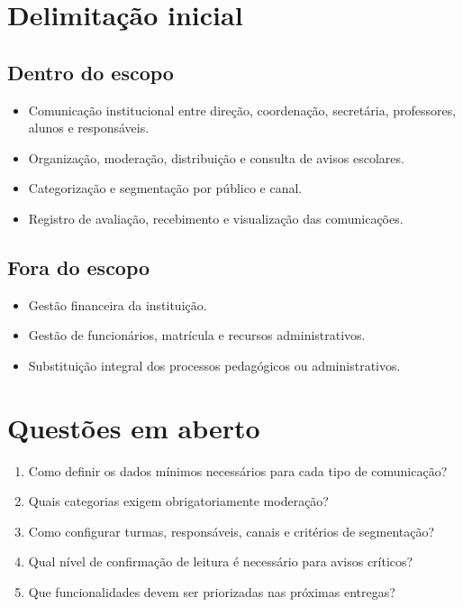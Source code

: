 \section{Delimitação inicial}
\subsection{Dentro do escopo}
\begin{itemize}
\item Comunicação institucional entre direção, coordenação, secretária, professores, alunos e responsáveis.
\item Organização, moderação, distribuição e consulta de avisos escolares.
\item Categorização e segmentação por público e canal.
\item Registro de avaliação, recebimento e visualização das comunicações.
\end{itemize}

\subsection{Fora do escopo}
\begin{itemize}
\item Gestão financeira da instituição.
\item Gestão de funcionários, matrícula e recursos administrativos.
\item Substituição integral dos processos pedagógicos ou administrativos.
\end{itemize}

\section{Questões em aberto}
\begin{enumerate}
\item Como definir os dados mínimos necessários para cada tipo de comunicação?
\item Quais categorias exigem obrigatoriamente moderação?
\item Como configurar turmas, responsáveis, canais e critérios de segmentação?
\item Qual nível de confirmação de leitura é necessário para avisos críticos?
\item Que funcionalidades devem ser priorizadas nas próximas entregas?
\end{enumerate}
